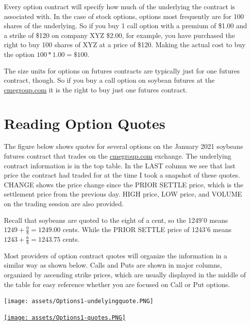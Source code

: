 \documentclass[
]{book}
\begin{document}
Every option contract will specify how much of the underlying the contract is associated with. In the case of stock options, options most frequently are for 100 shares of the underlying. So if you buy 1 call option with a premium of \$1.00 and a strike of \$120 on company XYZ \$2.00, for example, you have purchased the right to buy 100 shares of XYZ at a price of \$120. Making the actual cost to buy the option \(100*1.00 = \$100\).

The size units for options on futures contracts are typically just for one futures contract, though. So if you buy a call option on soybean futures at the \url{cmegroup.com} it is the right to buy just one futures contract.

\hypertarget{reading-option-quotes}{%
\section{Reading Option Quotes}\label{reading-option-quotes}}

The figure below shows quotes for several options on the January 2021 soybeans futures contract that trades on the \url{cmegroup.com} exchange. The underlying contract information is in the top table. In the LAST column we see that last price the contract had traded for at the time I took a snapshot of these quotes. CHANGE shows the price change since the PRIOR SETTLE price, which is the settlement price from the previous day. HIGH price, LOW price, and VOLUME on the trading session are also provided.

Recall that soybeans are quoted to the eight of a cent, so the 1249'0 means \(1249 + \frac{0}{8} = 1249.00\) cents. While the PRIOR SETTLE price of 1243'6 means \(1243 + \frac{6}{8} = 1243.75\) cents.

Most providers of option contract quotes will organize the information in a similar way as shown below. Calls and Puts are shown in major columns, organized by ascending strike prices, which are usually displayed in the middle of the table for easy reference whether you are focused on Call or Put options.

\texttt{[image: assets/Options1-undelyingquote.PNG]}

\href{https://www.cmegroup.com/trading/agricultural/grain-and-oilseed/soybean_contract_specifications.html}{\texttt{[image: assets/Options1-quotes.PNG]}}
\end{document}
